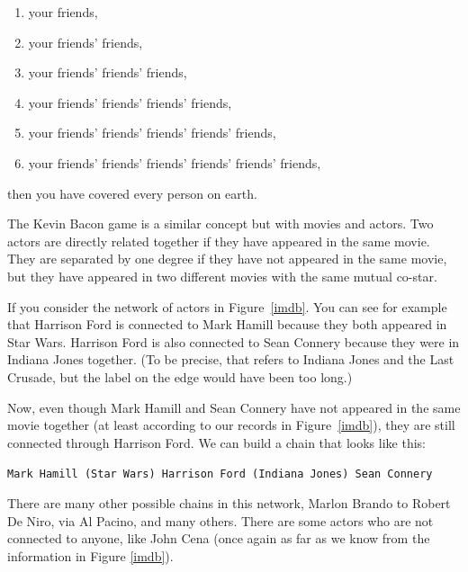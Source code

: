 \documentclass[11pt]{article}
\begin{document}
\begin{enumerate}
    \item your friends,
    \item your friends' friends,
    \item your friends' friends' friends,
    \item your friends' friends' friends' friends,
    \item your friends' friends' friends' friends' friends,
    \item your friends' friends' friends' friends' friends' friends,
\end{enumerate}    

then you have covered every person on earth.

The Kevin Bacon game is a similar concept but with movies and actors. Two actors are directly related together if they have appeared in the same movie. They are separated by one degree if they have not appeared in the same movie, but they have appeared in two different movies with the same mutual co-star.

If you consider the network of actors in Figure~\ref{imdb}. You can see for example that Harrison Ford is connected to Mark Hamill because they both appeared in Star Wars. Harrison Ford is also connected to Sean Connery because they were in Indiana Jones together. (To be precise, that refers to Indiana Jones and the Last Crusade, but the label on the edge would have been too long.)

Now, even though Mark Hamill and Sean Connery have not appeared in the same movie together (at least according to our records in Figure~\ref{imdb}), they are still connected through Harrison Ford. We can build a chain that looks like this:

\begin{center}
    \texttt{Mark Hamill (Star Wars) Harrison Ford (Indiana Jones) Sean Connery}
\end{center}

There are many other possible chains in this network, Marlon Brando to Robert De Niro, via Al Pacino, and many others. There are some actors who are not connected to anyone, like John Cena (once again as far as we know from the information in Figure \ref{imdb}).
\end{document}
